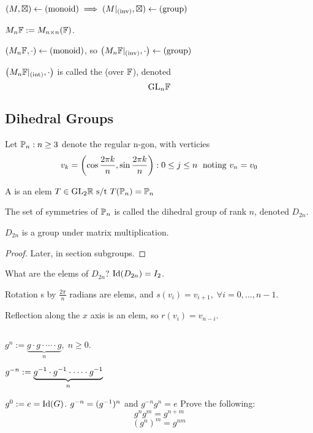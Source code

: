 \documentclass[12pt]{article}
\begin{document}
\((M,\boxtimes)\leftarrow(\mathrm{monoid})
\implies(M|_{(\mathrm{inv})},\boxtimes)\leftarrow(\mathrm{group})\)

\bboxex
{} \(M_n\mathbb F:=M_{n\times n}(\mathbb F)\).

\((M_n\mathbb F,\cdot)\leftarrow(\mathrm{monoid})\), so
\(\left(M_n\mathbb F|_{(\mathrm{inv})},\cdot\right)
\leftarrow(\mathrm{group})\)
\ebox


\bboxnote
\begin{nota}\label{nota:gen_L_group}
  \(\left(M_n\mathbb F|_{(\mathrm{int})},\cdot\right)\)
  is called the 
  (over \(\mathbb F\)), denoted
  \[\mathrm{GL}_n\mathbb F\]
\end{nota}
\ebox

\subsection{Dihedral Groups}
\bbox
\begin{defn}[N-Gon]\label{defn:n_gon}
  Let \(\mathbb P_n:n\ge3\) denote the regular
  n-gon, with verticies
  \[v_k=\left(
      \cos\frac{2\pi k}n,
      \sin\frac{2\pi k}n
  \right):0\le j\le n\;
\text{ noting }v_n=v_0\]
\end{defn}
\ebox

\bbox
\begin{defn}
  A  is an
  elem \(T\in\mathrm{GL}_2\mathbb R\text{ s/t }
  T(\mathbb P_n)=\mathbb P_n\)
\end{defn}
\ebox

\bbox
\begin{defn}\label{defn:dihedral_group}
  The set of symmetries of \(\mathbb P_n\) is called the dihedral group of rank \(n\), denoted \(D_{2n}\).
\end{defn}
\ebox

\bbox
\begin{lem}
  \(D_{2n}\) is a group under matrix multiplication.
\end{lem}
\ebox

\bboxproof
\begin{proof}
  Later, in section subgroups.
\end{proof}
\ebox

What are the elems of \(D_{2n}\)?
\(\mathrm{Id}(D_{2n})=I_2\).

Rotation s by \(\frac{2\pi}n\) radians are elems, and \(s(v_i)=v_{i+1},\;\forall i=0,\dots,n-1\).

Reflection along the \(x\) axis is an elem, so \(r(v_i)=v_{n-i}\).


\bbox
\begin{defn}\label{defn:group_power}
  \(\,\)

  \(g^n:=\underset n{\underbrace{g\cdot g\cdot \cdots \cdot g}},\;n\ge 0\).

  \(g^{-n}:=\underset n{\underbrace{g^{-1}\cdot g^{-1}\cdot\cdots\cdot g^{-1}}}\)

  \(g^0:=e=\mathrm{Id}(G)\).
  \bboxnote {}
  \(g^{-n}=(g^{-1})^n\) and
  \(g^{-n}g^n=e\) Prove the following:
  \[g^ng^m=g^{n+m}\]
  \[(g^n)^m=g^{nm}\]
  \ebox
\end{defn}
\ebox
\end{document}
